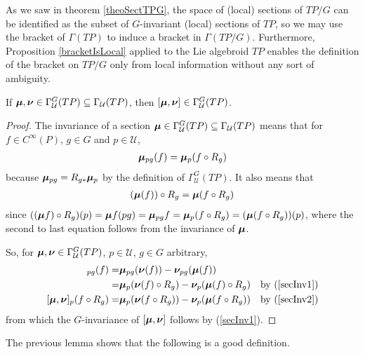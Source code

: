 As we saw in theorem \ref{theoSectTPG}, the space of (local) sections of $TP/G$ can be identified as the subset of $G$-invariant (local) sections of $TP$, so we may use the bracket of $\Gamma(TP)$ to induce a bracket in $\Gamma(TP/G)$. Furthermore, Proposition \ref{bracketIsLocal} applied to the Lie algebroid $TP$ enables the definition of the bracket on $TP/G$ only from local information without any sort of ambiguity.

\begin{lemma}
If $\bm{\mu}, \bm{\nu} \in \Gamma_{\mathcal U}^G(TP) \subseteq \Gamma_{\mathcal U}(TP)$, then $[\bm{\mu}, \bm{\nu}] \in \Gamma_{\mathcal U}^G(TP)$.
\end{lemma}

\begin{proof}
The invariance of a section $\bm{\mu} \in \Gamma_{\mathcal U}^G(TP) \subseteq \Gamma_{\mathcal U}(TP)$ means that for $f \in C^\infty(P)$, $g \in G$ and $p \in \mathcal U$,  
\begin{align} \label{secInv1}
\bm{\mu}_{pg} (f) = \bm{\mu}_p(f \circ R_g)\end{align} 
because $\bm{\mu}_{pg} = R_{g*} \bm{\mu}_p$ by the definition of $\Gamma_{\mathcal U}^G(TP)$. It also means that 
\begin{align}\label{secInv2}
(\bm{\mu} (f)) \circ R_g = \bm{\mu}(f \circ R_g)
\end{align}
since $((\bm{\mu} f) \circ R_g)(p) = \bm{\mu} f(pg) = \bm{\mu}_{pg} f = \bm{\mu}_p(f \circ R_g) = (\bm{\mu}(f \circ R_g))(p)$, where the second to last equation follows from the invariance of $\bm{\mu}$.
    
So, for $\bm{\mu}, \bm{\nu} \in \Gamma_{\mathcal U}^G(TP)$, $p \in \mathcal U$, $g \in G$ arbitrary,
\begin{align*}
    [\sect \mu, \sect \nu]_{pg}(f)
        =& \sect \mu_{pg}(\sect \nu(f)) - \sect \nu_{pg}(\sect \mu (f))\\
        =& \sect \mu_{p}(\sect \nu(f) \circ R_g) - \sect \nu_{p}(\sect \mu (f) \circ R_g) & \textrm{by } (\ref{secInv1})\\
    [\sect \mu, \sect \nu]_p (f \circ R_g) =& \sect \mu_p(\sect \nu(f \circ R_g)) - \sect \nu_p(\sect \mu(f \circ R_g)) & \textrm{by } (\ref{secInv2})
\end{align*}
from which the $G$-invariance of $[\bm{\mu}, \bm{\nu}]$ follows by (\ref{secInv1}).
\end{proof}

The previous lemma shows that the following is a good definition.

